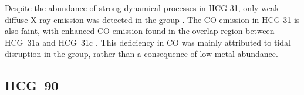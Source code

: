 \documentclass{aa}
\newcommand{\HI}{H\,{\sc i}}
\begin{document}
Despite the abundance of strong dynamical processes in HCG 31, only weak diffuse X-ray emission was detected in the group 
\citep{2013ApJ...763..121D}. The CO emission in HCG 31 is also faint, with enhanced CO emission found in the overlap region between HCG~31a and HCG~31c \citep{1997ApJ...475L..21Y}. 
This deficiency in CO was mainly attributed to tidal disruption in the group, rather than a consequence of low metal abundance.  
\subsection{HCG~90}
\end{document}
